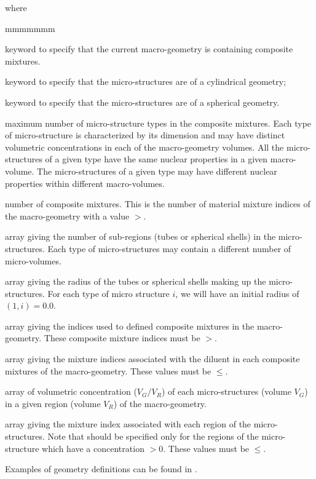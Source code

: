 \noindent where
\begin{ListeDeDescription}{mmmmmmm}

\item[\moc{BIHET}] keyword to specify that the current macro-geometry is containing composite mixtures.

\item[\moc{TUBE}] keyword to specify that the micro-structures are of a
cylindrical geometry;

\item[\moc{SPHE}] keyword to specify that the micro-structures are of a
spherical geometry.

\item[\dusa{nmistr}] maximum number of micro-structure types in the composite mixtures. Each type of
micro-structure is characterized by its dimension and may have distinct
volumetric concentrations in each of the macro-geometry volumes. All the
micro-structures of a given type have the same nuclear properties in a given
macro-volume. The micro-structures of a given type may have different nuclear
properties within different macro-volumes.

\item[\dusa{nmilg}] number of composite mixtures. This is the number of material mixture indices of the macro-geometry with a value $>$.

\item[\dusa{ns}] array giving the number of sub-regions (tubes or spherical
shells) in the  micro-structures. Each type of micro-structures may contain a
different number of micro-volumes.

\item[\dusa{rs}] array giving the radius of the tubes or spherical shells
making up the micro-structures. For each type of micro structure $i$, we will
have an initial radius of $(1,i)=0.0$.

\item[\dusa{milie}] array giving the indices used to defined composite mixtures in the macro-geometry. These composite mixture indices must be $>$.

\item[\dusa{mixdil}] array giving the mixture indices associated with the diluent in each composite mixtures of the macro-geometry.  These values must be $\le$.

\item[\dusa{fract}] array of volumetric concentration ($V_{G}/V_{R}$) of
each micro-structures (volume $V_{G}$) in a given region (volume $V_{R}$) of the
macro-geometry.  

\item[\dusa{mixgr}] array giving the mixture index associated with each
region of the micro-structures. Note that  should be specified only
for the regions of the micro-structure which have a concentration
$>$0. These values must be $\le$.

\end{ListeDeDescription}

Examples of geometry definitions can be found in .

\eject
